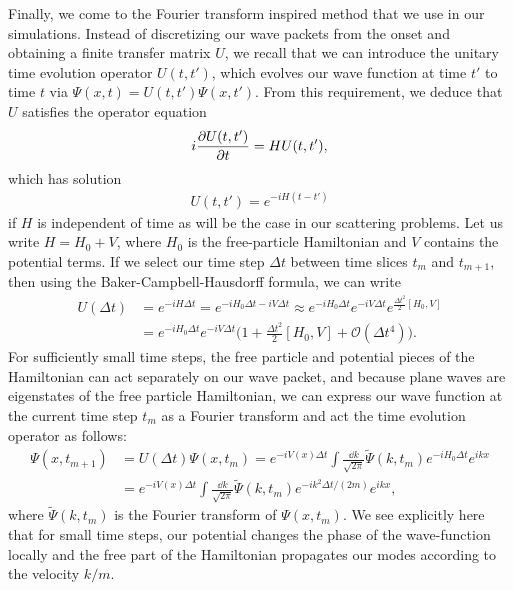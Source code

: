 Finally, we come to the Fourier transform inspired method that we use in our simulations.
Instead of discretizing our wave packets from the onset and obtaining a finite transfer matrix $U$, we recall that we can introduce the unitary time evolution operator $U(t,t')$, which evolves our wave function at time $t'$ to time $t$ via $\Psi(x,t) = U(t,t') \Psi(x,t')$.
From this requirement, we deduce that $U$ satisfies the operator equation
\begin{align}
    i \pdv{U(t,t')}{t} = H U(t,t')
,\end{align}
which has solution
\begin{align}
    U(t,t') = e^{-i H (t - t')}
\end{align}
if $H$ is independent of time as will be the case in our scattering problems.
Let us write $H = H_0 + V$, where $H_0$ is the free-particle Hamiltonian and $V$ contains the potential terms.
If we select our time step $\Delta t$ between time slices $t_{m}$ and $t_{m+1}$, then using the Baker-Campbell-Hausdorff formula, we can write
\begin{align}
    U(\Delta t) &= e^{-i H \Delta t} = e^{-i H_0 \Delta t - i V \Delta t} \approx e^{-i H_0 \Delta t} e^{-i V \Delta t} e^{\frac{\Delta t^2}{2} [H_0, V]} \nonumber \\
                &= e^{-i H_0 \Delta t} e^{-i V \Delta t} \Big( 1 + \frac{\Delta t^2}{2} [H_0,V] + \mathcal{O}(\Delta t^{4}) \Big)
.\end{align}
For sufficiently small time steps, the free particle and potential pieces of the Hamiltonian can act separately on our wave packet, and because plane waves are eigenstates of the free particle Hamiltonian, we can express our wave function at the current time step $t_{m}$ as a Fourier transform and act the time evolution operator as follows:
\begin{align}
    \Psi(x,t_{m+1}) &= U(\Delta t) \Psi(x,t_{m}) = e^{-i V(x) \Delta t} \int \frac{\dd{k}}{\sqrt{2 \pi}} \widetilde{\Psi}(k,t_{m}) e^{-i H_0 \Delta t} e^{i k x} \nonumber \\
    &= e^{-i V(x) \Delta t} \int \frac{\dd{k}}{\sqrt{2 \pi}} \widetilde{\Psi}(k,t_{m}) e^{- i k^2 \Delta t / (2m)} e^{i k x}
,\end{align}
where $\widetilde{\Psi}(k,t_{m})$ is the Fourier transform of $\Psi(x,t_{m})$.
We see explicitly here that for small time steps, our potential changes the phase of the wave-function locally and the free part of the Hamiltonian propagates our modes according to the velocity $k/m$.

